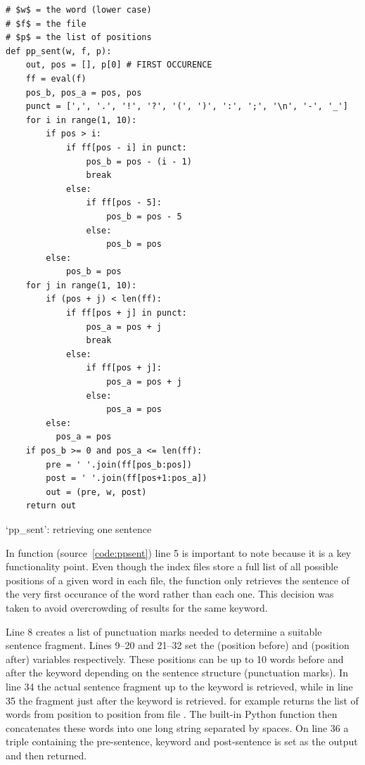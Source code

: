 \begin{listing}
  \begin{verbatim}
# $w$ = the word (lower case)
# $f$ = the file
# $p$ = the list of positions
def pp_sent(w, f, p):
    out, pos = [], p[0] # FIRST OCCURENCE
    ff = eval(f)
    pos_b, pos_a = pos, pos
    punct = [',', '.', '!', '?', '(', ')', ':', ';', '\n', '-', '_']
    for i in range(1, 10):
        if pos > i:
            if ff[pos - i] in punct:
                pos_b = pos - (i - 1)
                break
            else:
                if ff[pos - 5]:
                    pos_b = pos - 5
                else:
                    pos_b = pos
        else:
            pos_b = pos
    for j in range(1, 10):
        if (pos + j) < len(ff):
            if ff[pos + j] in punct:
                pos_a = pos + j
                break
            else:
                if ff[pos + j]:
                    pos_a = pos + j
                else:
                    pos_a = pos
        else:
          pos_a = pos
    if pos_b >= 0 and pos_a <= len(ff):
        pre = ' '.join(ff[pos_b:pos])
        post = ' '.join(ff[pos+1:pos_a])
        out = (pre, w, post)
    return out
  \end{verbatim}
\caption[`pp\_sent' function]{`pp\_sent': retrieving one sentence}
\label{code:ppsent}
\end{listing}

In function  (source~\ref{code:ppsent}) line 5 is important to note because it is a key functionality point. Even though the index files store a full list of all possible positions of a given word in each file, the  function only retrieves the sentence of the very first occurance of the word rather than each one. This decision was taken to avoid overcrowding of results for the same keyword.

Line 8 creates a list of punctuation marks needed to determine a suitable sentence fragment. Lines 9--20 and 21--32 set the  (position before) and  (position after) variables respectively. These positions can be up to 10 words before and after the keyword  depending on the sentence structure (punctuation marks). In line 34 the actual sentence fragment up to the keyword is retrieved, while in line 35 the fragment just after the keyword is retrieved.  for example returns the list of words from position  to position  from file . The built-in Python  function then concatenates these words into one long string separated by spaces. On line 36 a triple containing the pre-sentence, keyword and post-sentence is set as the output and then returned.

